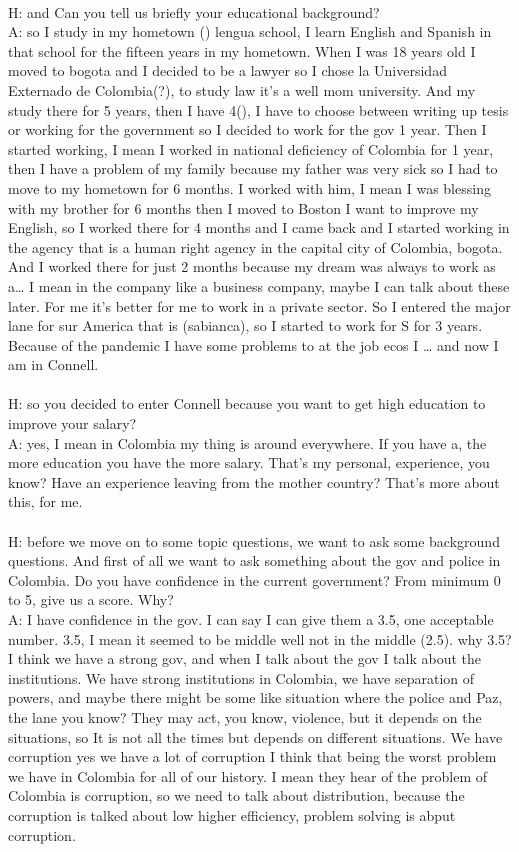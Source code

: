 \documentclass{phyasgn}\usepackage{nag}
\begin{document}
\\
H: and Can you tell us briefly your educational background?\\
A: so I study in my hometown () lengua school, I learn English and Spanish in that school for the fifteen years in my hometown. When I was 18 years old I moved to bogota and I decided to be a lawyer so I chose la Universidad Externado de Colombia(?), to study law it’s a well mom university. And my study there for 5 years, then I have 4(), I have to choose between writing up tesis or working for the government so I decided to work for the gov 1 year. Then I started working, I mean I worked in national deficiency of Colombia for 1 year, then I have a problem of my family because my father was very sick so I had to move to my hometown for 6 months. I worked with him, I mean I was blessing with my brother for 6 months then I moved to Boston I want to improve my English, so I worked there for 4 months and I came back and I started working in the agency that is a human right agency in the capital city of Colombia, bogota. And I worked there for just 2 months because my dream was always to work as a… I mean in the company like a business company, maybe I can talk about these later. For me it’s better for me to work in a private sector. So I entered the major lane for sur America that is (sabianca), so I started to work for S for 3 years. Because of the pandemic I have some problems to at the job ecos I … and now I am in Connell.\\
\\
H: so you decided to enter Connell because you want to get high education to improve your salary?\\
A: yes, I mean in Colombia my thing is around everywhere. If you have a, the more education you have the more salary. That’s my personal, experience, you know? Have an experience leaving from the mother country? That’s more about this, for me.\\
\\
H: before we move on to some topic questions, we want to ask some background questions. And first of all we want to ask something about the gov and police in Colombia. Do you have confidence in the current government? From minimum 0 to 5, give us a score. Why?\\
A: I have confidence in the gov. I can say I can give them a 3.5, one acceptable number. 3.5, I mean it seemed to be middle well not in the middle (2.5). why 3.5?  I think we have a strong gov, and when I talk about the gov I talk about the institutions. We have strong institutions in Colombia, we have separation of powers, and maybe there might be some like situation where the police and Paz, the lane you know? They may act, you know, violence, but it depends on the situations, so It is not all the times but depends on different situations. We have corruption yes we have a lot of corruption I think that being the worst problem we have in Colombia for all of our history. I mean they hear of the problem of Colombia is corruption, so we need to talk about distribution, because the corruption is talked about low higher efficiency, problem solving is abput corruption.\\
\end{document}
